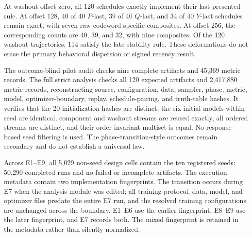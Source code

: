\documentclass[11pt,a4paper]{article}
\begin{document}
At washout offset zero, all 120 schedules exactly implement their last-presented rule. At offset 128, 40 of 40 $P$-last, 39 of 40 $Q$-last, and 34 of 40 $Y$-last schedules remain exact, with seven raw-codeword-specific composites. At offset 256, the corresponding counts are 40, 39, and 32, with nine composites. Of the 120 washout trajectories, 114 satisfy the late-stability rule. These deformations do not erase the primary behavioral dispersion or signed recency result.

The outcome-blind pilot audit checks nine complete artifacts and 45,369 metric records. The full strict analysis checks all 120 expected artifacts and 2,417,880 metric records, reconstructing source, configuration, data, sampler, phase, metric, model, optimizer-boundary, replay, schedule-pairing, and truth-table hashes. It verifies that the 20 initialization hashes are distinct, the six initial models within seed are identical, component and washout streams are reused exactly, all ordered streams are distinct, and their order-invariant multiset is equal. No response-based seed filtering is used. The phase-transition-style outcomes remain secondary and do not establish a universal law.

Across E1--E9, all 5,029 non-seed design cells contain the ten registered seeds: 50,290 completed runs and no failed or incomplete artifacts. The execution metadata contain two implementation fingerprints. The transition occurs during E7 when the analysis module was edited; all training-protocol, data, model, and optimizer files predate the entire E7 run, and the resolved training configurations are unchanged across the boundary. E1--E6 use the earlier fingerprint, E8--E9 use the later fingerprint, and E7 records both. The mixed fingerprint is retained in the metadata rather than silently normalized.
\end{document}
